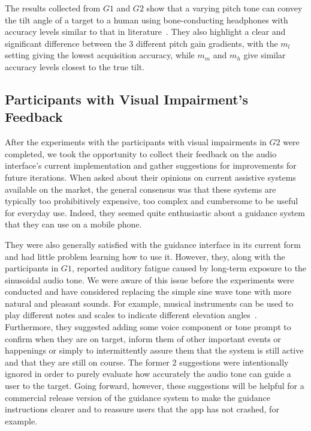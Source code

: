 \documentclass[sigconf, screen=true, anonymous=true]{acmart}
\begin{document}
The results collected from $G1$ and $G2$ show that a varying pitch tone can convey the tilt angle of a target to a human using bone-conducting headphones with accuracy levels similar to that in literature~\cite{bujacz2011sonification, katz2011spatial, zotkin2004rendering}.
They also highlight a clear and significant difference between the 3 different pitch gain gradients, with the $m_l$ setting giving the lowest acquisition accuracy, while $m_m$ and $m_h$ give similar accuracy levels closest to the true tilt. 

\subsection{Participants with Visual Impairment's Feedback}

After the experiments with the participants with visual impairments in $G2$ were completed, we took the opportunity to collect their feedback on the audio interface's current implementation and gather suggestions for improvements for future iterations.
When asked about their opinions on current assistive systems available on the market, the general consensus was that these systems are typically too prohibitively expensive, too complex and cumbersome to be useful for everyday use.
Indeed, they seemed quite enthusiastic about a guidance system that they can use on a mobile phone.

They were also generally satisfied with the guidance interface in its current form and had little problem learning how to use it.
However, they, along with the participants in $G1$, reported auditory fatigue caused by long-term exposure to the sinusoidal audio tone.
We were aware of this issue before the experiments were conducted and have considered replacing the simple sine wave tone with more natural and pleasant sounds.
For example, musical instruments can be used to play different notes and scales to indicate different elevation angles~\cite{brewster1998using}.
Furthermore, they suggested adding some voice component or tone prompt to confirm when they are on target, inform them of other important events or happenings or simply to intermittently assure them that the system is still active and that they are still on course.
The former 2 suggestions were intentionally ignored in order to purely evaluate how accurately the audio tone can guide a user to the target.
Going forward, however, these suggestions will be helpful for a commercial release version of the guidance system to make the guidance instructions clearer and to reassure users that the app has not crashed, for example.
\end{document}
